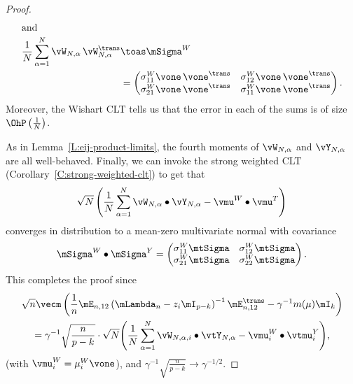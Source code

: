 \begin{proof}
\begin{align*}
    \intertext{and}
        \frac{1}{N}
        \sum_{\alpha=1}^N
            \vW_{N,\alpha} \,
            \vW_{N,\alpha}^\trans
            &\toas
                \mSigma^W \\
            &=
                \left(
                \begin{matrix}
                    \sigma^W_{11} \vone \, \vone^\trans &
                        \sigma^W_{12} \vone \, \vone^\trans \\
                    \sigma^W_{21} \vone \, \vone^\trans &
                        \sigma^W_{11} \vone \, \vone^\trans
                \end{matrix}
                \right).
    \end{align*}
    Moreover, the Wishart CLT tells us that the error in each of the
    sums is of size $\OhP\left( \frac{1}{N} \right)$.  
        
    As in Lemma~\ref{L:eij-product-limits}, the fourth moments of
    $\vW_{N,\alpha}$ and $\vY_{N,\alpha}$ are all well-behaved.  Finally,
    we can invoke the strong weighted CLT 
    (Corollary~\ref{C:strong-weighted-clt}) to get that
    \[
        \sqrt{N} \left(
            \frac{1}{N}
            \sum_{\alpha=1}^N
                \vW_{N,\alpha} \bullet \vY_{N,\alpha}
            -
                \vmu^W \bullet \vmu^T
        \right)
    \]
    converges in distribution to a mean-zero multivariate normal with
    covariance
    \[
        \mSigma^W \bullet \mSigma^Y
            =
                \left(
                \begin{matrix}
                    \sigma^W_{11} \mtSigma &
                        \sigma^W_{12} \mtSigma \\
                    \sigma^W_{21} \mtSigma &
                        \sigma^W_{22} \mtSigma 
                \end{matrix}
                \right).
    \]
    This completes the proof since
    \begin{multline*}
        \sqrt{n}
        \vecm \left(
            \frac{1}{n}
            \mE_{n,12}
            \left(
                \mLambda_n
                -
                z_i
                \mI_{p-k}
            \right)^{-1}
            \mE_{n,12}^\trans
            -
            \gamma^{-1}
            m( \mu )
            \mI_k
        \right) \\
            =
                \gamma^{-1}
                \sqrt{ \frac{n}{p-k} }
                \cdot
                \sqrt{ N }
                \Bigg( 
                    \frac{1}{N}
                    \sum_{\alpha=1}^N
                        \vW_{N,\alpha,i} \bullet \vtY_{N,\alpha}
                    -
                        \vmu_i^W \bullet \vtmu_i^Y
                \Bigg),
    \end{multline*}
    (with $\vmu_i^W = \mu_i^W \vone$),
    and
    \(
        \gamma^{-1}
        \sqrt{ \frac{n}{p-k} }
        \to
        \gamma^{-1/2}.
    \)
\end{proof}

